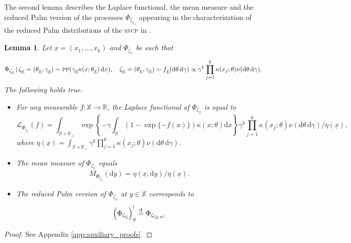 \documentclass[11pt,a4paper,oneside]{article}
\newcommand{\deq}{\stackrel{\mbox{\scriptsize d}}{=}}
\newcommand{\dd}{\mathrm d}
\newcommand{\X}{\mathbb{X}}
\newcommand{\R}{\mathbb{R}}
\renewcommand{\mid}{\ensuremath{\,|\,}}
\newtheorem{lemma}{Lemma}
\theoremstyle{definition}
\theoremstyle{remark}
\begin{document}
The second lemma describes the Laplace functional, the mean measure and the reduced Palm version of the processes $\Phi_{\zeta_{\underline{x}_h}}$ appearing in the characterization of the reduced Palm distributions of the \textsc{sncp} in .
\begin{lemma}\label{lemma:laplace_cox_terms}
Let $\underline{x}= (x_1,\ldots,x_k)$ and $\Phi_{\zeta_{\underline{x}}}$ be such that
\[
\Phi_{\zeta_{{\underline{x}}}} \mid \zeta_{{\underline{x}}} = (\theta_{{\underline{x}}}, \gamma_{{\underline{x}}}) \sim \textsc{pp}(\gamma_{{\underline{x}}} \kappa(x; \theta_{{\underline{x}}}) \,\dd x), \quad \zeta_{{\underline{x}}} = (\theta_{{\underline{x}}}, \gamma_{{\underline{x}}}) \sim f_{{\underline{x}}}(\dd \theta\, \dd \gamma) \propto \gamma^{k} \prod_{j=1}^k \kappa(x_j; \theta) \nu(\dd \theta \, \dd \gamma).
\]
The following holds true.
\begin{itemize}
    \item[(i)] For any measurable $f:\X \to \R$, the Laplace functional of $\Phi_{\zeta_{\underline{x}}}$ is equal to 
\[
\mathcal{L}_{\Phi_{\zeta_{\underline{x}}}}(f) = \int_{\X\times\R_+} \exp\left\{ -\gamma \int_{\X} (1 - \exp\{- f(x)\}) \kappa(x; \theta) \dd x \right\} \gamma^k \prod_{j=1}^k \kappa(x_j;  \theta)\nu(\dd \theta\, \dd \gamma) / \eta(\underline{x}),
\]
where $\eta(\underline{x}) = \int_{\X\times\R_+} \gamma^k \prod_{j=1}^k \kappa(x_j; \theta) \nu(\dd \theta \,\dd \gamma)$.\\
\item[(ii)] The mean measure of $\Phi_{\zeta_{\underline{x}}}$ equals
\begin{equation}\label{eq:mean_measure_components}
M_{\Phi_{\zeta_{\underline{x}}}}(\dd y) = \eta(\underline{x}, \dd y)/\eta(\underline{x}).    
\end{equation}
\item[(iii)] The reduced Palm version of $\Phi_{\zeta_{\underline{x}}}$ at $y\in \X$ corresponds to
\begin{equation}\label{eq:red_Palm_components}
    \left( \Phi_{\zeta_{{\underline{x}}}} \right)^!_{y} \deq \Phi_{\zeta_{({\underline{x}}, y)}}
\end{equation}
\end{itemize}
\end{lemma}
\begin{proof}
    See Appendix \ref{app:auxiliary_proofs}.
\end{proof}
\end{document}
